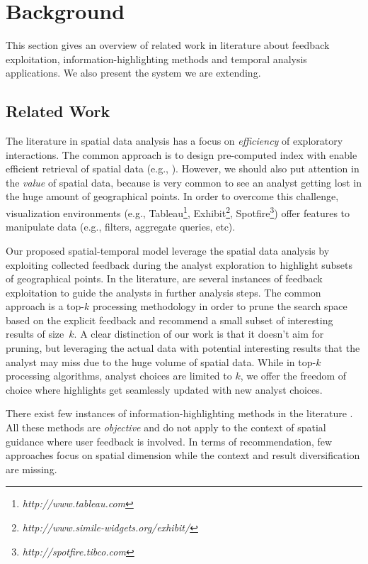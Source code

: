 \chapter{Background}
\label{chap:background}

This section gives an overview of related work in literature about feedback exploitation, information-highlighting methods and temporal analysis applications. We also present the system we are extending.

\section{Related Work}

The literature in spatial data analysis has a focus on {\em efficiency} of exploratory interactions. The common approach is to design pre-computed index with enable efficient retrieval of spatial data (e.g., \cite{lins2013nanocubes}). However,
we should also put attention in the {\em value} of spatial data, because is very common to see an analyst getting lost in the huge amount of geographical points. In order to overcome this challenge, visualization environments (e.g., Tableau\footnote{\it http://www.tableau.com}, Exhibit\footnote{\it http://www.simile-widgets.org/exhibit/}, Spotfire\footnote{\it  http://spotfire.tibco.com}) offer features to manipulate data (e.g., filters, aggregate queries, etc).

Our proposed spatial-temporal model leverage the spatial data analysis by exploiting collected feedback during the analyst exploration to highlight subsets of geographical points. In the literature, are several instances of feedback exploitation to guide the analysts in further analysis steps.  The common approach is a top-$k$ processing methodology in order to prune the search space based on the explicit feedback and recommend a small subset of interesting results of size~$k$. A clear distinction of our work is that it doesn't aim for pruning, but leveraging the actual data with potential interesting results that the analyst may miss due to the huge volume of spatial data. While in top-$k$ processing algorithms, analyst choices are limited to $k$, we offer the freedom of choice where highlights get seamlessly updated with new analyst choices.

There exist few instances of information-highlighting methods in the literature \cite{Liang2010,Robinson2011,wongsuphasawat2016voyager,willett2007scented}. All these methods are {\em objective} and do not apply to the context of spatial guidance where user feedback is involved. In terms of recommendation, few approaches focus on spatial dimension \cite{Bao2015,Levandoski:2012} while the context and result diversification are missing.

